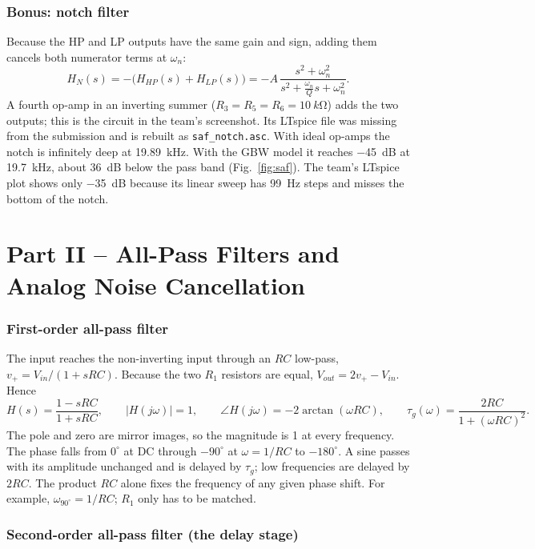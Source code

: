 \section{Bonus: notch filter}
Because the HP and LP outputs have the same gain and sign, adding them cancels both numerator terms at $\omega_n$:
\[
H_N(s) = -\big(H_{HP}(s) + H_{LP}(s)\big) = -A\,\frac{s^2 + \omega_n^2}{s^2 + \frac{\omega_n}{Q}s + \omega_n^2}.
\]
A fourth op-amp in an inverting summer ($R_3=R_5=R_6=\SI{10}{k\ohm}$) adds the two outputs; this is the
circuit in the team's screenshot. Its LTspice file was missing from the submission and is rebuilt
as \texttt{saf\_notch.asc}. With ideal op-amps the notch is infinitely deep at \SI{19.89}{kHz}. With
the GBW model it reaches \SI{-45}{dB} at \SI{19.7}{kHz}, about \SI{36}{dB} below the pass band
(Fig.~\ref{fig:saf}). The team's LTspice plot shows only \SI{-35}{dB} because its linear sweep has
\SI{99}{Hz} steps and misses the bottom of the notch.

\part*{Part II -- All-Pass Filters and Analog Noise Cancellation}
\section{First-order all-pass filter}
The input reaches the non-inverting input through an $RC$ low-pass, $v_+ = V_{in}/(1+sRC)$. Because the two
$R_1$ resistors are equal, $V_{out} = 2v_+ - V_{in}$. Hence
\[
H(s) = \frac{1 - sRC}{1 + sRC},\qquad |H(j\omega)| = 1,\qquad
\angle H(j\omega) = -2\arctan(\omega RC),\qquad
\tau_g(\omega) = \frac{2RC}{1 + (\omega RC)^2}.
\]
The pole and zero are mirror images, so the magnitude is 1 at every frequency. The phase falls from
$0^\circ$ at DC through $-90^\circ$ at $\omega = 1/RC$ to $-180^\circ$. A sine passes with its amplitude unchanged and
is delayed by $\tau_g$; low frequencies are delayed by $2RC$. The product $RC$ alone fixes the frequency of any given phase
shift. For example, $\omega_{90^\circ} = 1/RC$; $R_1$ only has to be matched.

\section{Second-order all-pass filter (the delay stage)}
